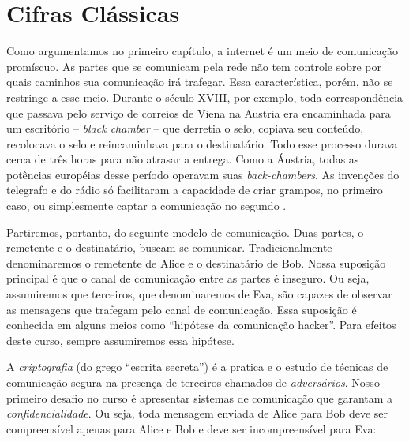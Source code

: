 ﻿\chapter{Cifras Clássicas}
\label{cha:cifras-classicas}

Como argumentamos no primeiro capítulo, a internet é um meio de comunicação promíscuo.
As partes que se comunicam pela rede não tem controle sobre por quais caminhos sua comunicação irá trafegar.
Essa característica, porém, não se restringe a esse meio.
Durante o século XVIII, por exemplo, toda correspondência que passava pelo serviço de correios de Viena na Austria era encaminhada para um escritório -- {\em black chamber} -- que derretia o selo, copiava seu conteúdo, recolocava o selo e reincaminhava para o destinatário.
Todo esse processo durava cerca de três horas para não atrasar a entrega.
Como a Áustria, todas as potências européias desse período operavam suas {\em back-chambers}.
As invenções do telegrafo e do rádio só facilitaram a capacidade de criar grampos, no primeiro caso, ou simplesmente captar a comunicação no segundo \cite{Kahn96}.

Partiremos, portanto, do seguinte modelo de comunicação.
Duas partes, o remetente e o destinatário, buscam se comunicar.
Tradicionalmente denominaremos o remetente de Alice e o destinatário de Bob.
Nossa suposição principal é que o canal de comunicação entre as partes é inseguro.
Ou seja, assumiremos que terceiros, que denominaremos de Eva, são capazes de observar as mensagens que trafegam pelo canal de comunicação.
Essa suposição é conhecida em alguns meios como ``hipótese da comunicação hacker''.
Para efeitos deste curso, sempre assumiremos essa hipótese.

A {\em criptografia} (do grego ``escrita secreta'') é a pratica e o estudo de técnicas de comunicação segura na presença de terceiros chamados de {\em adversários}.
Nosso primeiro desafio no curso é apresentar sistemas de comunicação que garantam a {\em confidencialidade}.
Ou seja, toda mensagem enviada de Alice para Bob deve ser compreensível apenas para Alice e Bob e deve ser incompreensível para Eva:
\begin{center}
\end{center}

